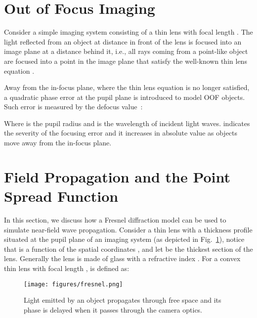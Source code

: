 \documentclass[preprint,5p,twocolumn]{elsarticle}
\begin{document}
\section*{}
\setcounter{section}{0}
\section{Out of Focus Imaging}

\label{sec:oof}
Consider a simple imaging system consisting of a thin lens with focal length . The light reflected from an object at distance  in front of the lens is focused into an image plane at a distance  behind it, i.e., all rays coming from a point-like object are focused into a point in the image plane that satisfy the well-known thin lens equation .

Away from the in-focus plane, where the thin lens equation is no longer satisfied, a quadratic phase error at the pupil plane is introduced to model OOF objects. Such error is measured by the defocus value~\cite{goodman2005introduction}:



Where  is the pupil radius and  is the wavelength of incident light waves.  indicates the severity of the focusing error and it increases in absolute value as objects move away from the in-focus plane.



\section{Field Propagation and the Point Spread Function}
\label{sec:fp}
In this section, we discuss how a Fresnel diffraction model can be used to simulate near-field wave propagation.
Consider a  thin lens with a thickness profile  situated at the pupil plane of an imaging system (as depicted in Fig.~\ref{fig:fresnel}), notice that  is a function of the  spatial coordinates , and let  be the thickest section of the lens. Generally the lens is made of glass with a refractive index . For a convex thin lens with focal length ,  is  defined as:



\begin{figure}[htp]
\centering
\texttt{[image: figures/fresnel.png]}
\caption{Light emitted by an object propagates through free space and its phase is delayed when it passes through the camera optics.}
\label{fig:fresnel}
\end{figure}
\end{document}
